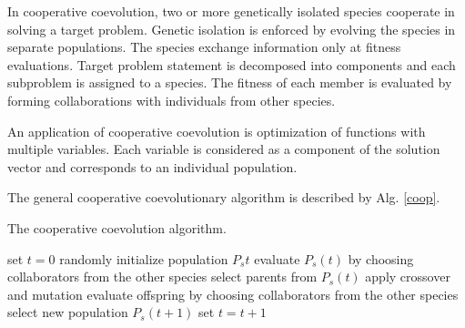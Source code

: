 In cooperative coevolution, two or more genetically isolated species cooperate in solving a target problem. 
Genetic isolation is enforced by evolving the species in separate populations. 
The species exchange information only at fitness evaluations. 
Target problem statement is decomposed into components and each subproblem is assigned to a species. 
The fitness of each member is evaluated by forming collaborations with individuals from other species. 

An application of cooperative coevolution is optimization of functions with multiple variables. 
Each variable is considered as a component of the solution vector and corresponds to an individual population. 

The general cooperative coevolutionary algorithm is described by Alg. \ref{coop}.

\begin{algorithm}
\caption{The cooperative coevolution algorithm.\label{coop}}
\begin{algorithmic}[1]
\State set $t=0$
\State randomly initialize population $P_s{t}$
\EndFor
{}
\State evaluate $P_s(t)$ by choosing collaborators from the other species
\EndFor
{}
\State select parents from $P_s(t)$
\State apply crossover and mutation
\State evaluate offspring by choosing collaborators from the other species
\State select new population $P_s(t+1)$
\EndFor
\State set $t=t+1$
\EndWhile
\end{algorithmic}
\end{algorithm}

